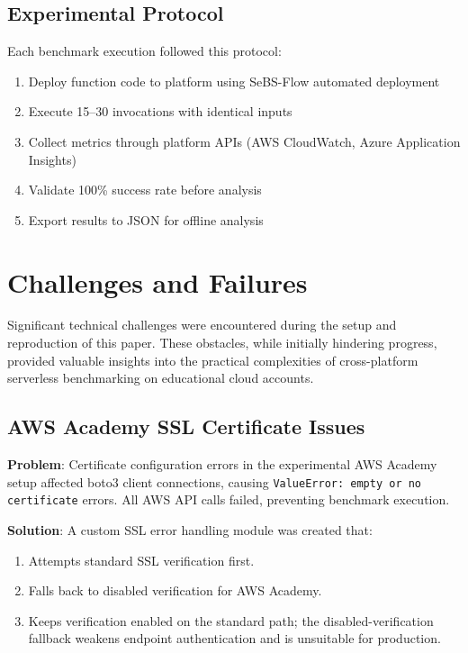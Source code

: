 \documentclass[sigconf,nonacm]{acmart}
\begin{document}
\subsection{Experimental Protocol}

Each benchmark execution followed this protocol:

\begin{enumerate}
    \item Deploy function code to platform using SeBS-Flow automated deployment
    \item Execute 15--30 invocations with identical inputs
    \item Collect metrics through platform APIs (AWS CloudWatch, Azure Application Insights)
    \item Validate 100\% success rate before analysis
    \item Export results to JSON for offline analysis
\end{enumerate}

\section{Challenges and Failures}

Significant technical challenges were encountered during the setup and reproduction of this paper. These obstacles, while initially hindering progress, provided valuable insights into the practical complexities of cross-platform serverless benchmarking on educational cloud accounts.


\subsection{AWS Academy SSL Certificate Issues}

\textbf{Problem}: Certificate configuration errors in the experimental AWS Academy setup affected boto3 client connections, causing \texttt{ValueError: empty or no certificate} errors. All AWS API calls failed, preventing benchmark execution.

\textbf{Solution}: A custom SSL error handling module was created that:
\begin{enumerate}
    \item Attempts standard SSL verification first.
    \item Falls back to disabled verification for AWS Academy.
    \item Keeps verification enabled on the standard path; the disabled-verification fallback weakens endpoint authentication and is unsuitable for production.
\end{enumerate}
\end{document}
